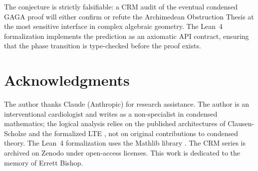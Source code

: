 \documentclass[11pt,a4paper]{article}
\theoremstyle{plain}
\theoremstyle{definition}
\begin{document}
The conjecture is strictly falsifiable: a CRM audit of the eventual condensed GAGA proof will either confirm or refute the Archimedean Obstruction Thesis at the most sensitive interface in complex algebraic geometry.
The Lean~4 formalization implements the prediction as an axiomatic API contract, ensuring that the phase transition is type-checked before the proof exists.

\section*{Acknowledgments}

The author thanks Claude (Anthropic) for research assistance.
The author is an interventional cardiologist and writes as a non-specialist in condensed mathematics; the logical analysis relies on the published architectures of Clausen-Scholze \cite{ClausenScholze2022} and the formalized LTE \cite{Commelin2022}, not on original contributions to condensed theory.
The Lean~4 formalization uses the Mathlib library \cite{Mathlib}.
The CRM series is archived on Zenodo under open-access licenses.
This work is dedicated to the memory of Errett Bishop.
\end{document}
